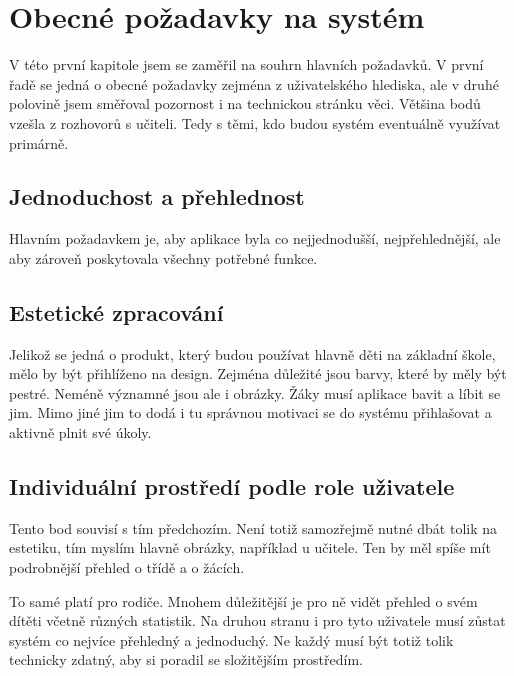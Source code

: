 

\chapter{Obecné požadavky na systém}

V této první kapitole jsem se zaměřil na souhrn hlavních požadavků. V první řadě se jedná o obecné požadavky zejména z uživatelského hlediska, ale v druhé polovině jsem směřoval pozornost i na technickou stránku věci.
Většina bodů vzešla z rozhovorů s učiteli. Tedy s těmi, kdo budou systém eventuálně využívat primárně.











\section{Jednoduchost a přehlednost}

Hlavním požadavkem je, aby aplikace byla co nejjednodušší, nejpřehlednější, ale aby zároveň poskytovala všechny potřebné funkce.



\section{Estetické zpracování}

Jelikož se jedná o produkt, který budou používat hlavně děti na základní škole, mělo by být přihlíženo na design. Zejména důležité jsou barvy, které by měly být pestré. Neméně významné jsou ale i obrázky. Žáky musí aplikace bavit a líbit se jim. Mimo jiné jim to dodá i tu správnou motivaci se do systému přihlašovat a aktivně plnit své úkoly.


\section{Individuální prostředí podle role uživatele}

Tento bod souvisí s tím předchozím. Není totiž samozřejmě nutné dbát tolik na estetiku, tím myslím hlavně obrázky, například u učitele. Ten by měl spíše mít podrobnější přehled o třídě a o žácích.

To samé platí pro rodiče. Mnohem důležitější je pro ně vidět přehled o svém dítěti včetně různých statistik. Na druhou stranu i pro tyto uživatele musí zůstat systém co nejvíce přehledný a jednoduchý. Ne každý musí být totiž tolik technicky zdatný, aby si poradil se složitějším prostředím.



